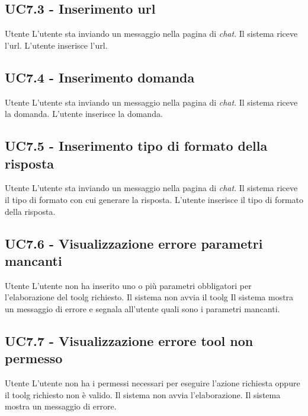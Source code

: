 \subsection{UC7.3 - Inserimento url}
\label{7.3}
\makeUC{}
{Utente}
{L'utente sta inviando un messaggio nella pagina di \textit{chat}.}
{Il sistema riceve l'url.}
{L'utente inserisce l'url.}{}{}{}{}

\subsection{UC7.4 - Inserimento domanda}
\label{7.4}
\makeUC{}
{Utente}
{L'utente sta inviando un messaggio nella pagina di \textit{chat}.}
{Il sistema riceve la domanda.}
{L'utente inserisce la domanda.}{}{}{}{}

\subsection{UC7.5 - Inserimento tipo di formato della risposta}
\label{7.5}
\makeUC{}
{Utente}
{L'utente sta inviando un messaggio nella pagina di \textit{chat}.}
{Il sistema riceve il tipo di formato con cui generare la risposta.}
{L'utente inserisce il tipo di formato della risposta.}{}{}{}{}

\subsection{UC7.6 - Visualizzazione errore parametri mancanti}
\label{7.6}
\makeUC{}
{Utente}
{L'utente non ha inserito uno o più parametri obbligatori per l'elaborazione del \gls{toolg} richiesto.}
{Il sistema non avvia il \gls{toolg}}
{Il sistema mostra un messaggio di errore e 
segnala all'utente quali sono i parametri mancanti.}{}{}{}{}

\subsection{UC7.7 - Visualizzazione errore tool non permesso}
\label{7.7}
\makeUC{}
{Utente}
{L'utente non ha i permessi necessari per eseguire l'azione richiesta 
oppure il \gls{toolg} richiesto non è valido.}
{Il sistema non avvia l'elaborazione.}
{Il sistema mostra un messaggio di errore.}{}{}{}{}

